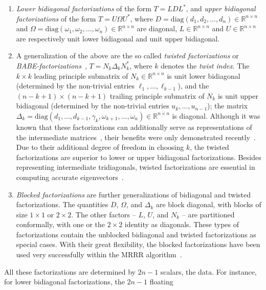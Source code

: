 \documentclass[final]{siamltex}
\newcommand{\R}{\mathbb{R}}
\newcommand{\Rnn}{\R^{n \times n}}
\begin{document}
\begin{enumerate}
\item {\it Lower bidiagonal factorizations} of the form $T = L D L^*$, and {\it
    upper bidiagonal factorizations} of the form $T = U \Omega U^*$, where $D = 
  \mbox{diag}(d_1,d_2,\ldots,d_n) \in \Rnn$ and $\Omega = 
  \mbox{diag}(\omega_1,\omega_2,\ldots,\omega_n) \in \Rnn$ are diagonal,  
  $L \in \Rnn$ and $U \in \Rnn$ are respectively unit lower bidiagonal and
  unit upper bidiagonal. 
\item A generalization of the above are the so called {\it twisted
    factorizations} or {\it
    BABE-factorizations}~\cite{Fernando97}, $T = N_k 
  \Delta_k N_k^*$, where 
  $k$ denotes the {\it twist index}. The $k \times k$ leading principle
  submatrix of $N_k \in \Rnn$ is unit lower bidiagonal (determined by the non-trivial
  entries $\ell_1,\ldots,\ell_{k-1}$), and the $(n-k+1) \times (n-k+1)$
  trailing principle submatrix of $N_k$ is unit upper bidiagonal (determined by the non-trivial
  entries $u_k,\ldots,u_{n-1}$); the matrix $\Delta_k =
\mbox{diag}(d_1,\ldots,d_{k-1},\gamma_k,\omega_{k+1},\ldots,\omega_n) \in \Rnn$ 
is diagonal. 
Although 
it was known that these factorizations can additionally serve as
representations of the intermediate
matrices~\cite{Dhillon:Diss,Dhillon:2004:Ortvecs},
their benefits were only demonstrated 
recently~\cite{Willems:Diss,Willems:twisted}. 
Due to their additional degree of freedom in choosing $k$, the twisted
factorizations
are superior to lower or upper bidiagonal factorizations. 
Besides representing intermediate tridiagonals, twisted factorizations are
essential in computing accurate eigenvectors~\cite{Fernando97,Dhillon:2004:Ortvecs}.
\item {\it Blocked
    factorizations} are further generalizations of bidiagonal and twisted factorizations. The
  quantities $D$, $\Omega$, and  
  $\Delta_k$ are block diagonal, with blocks of size $1 \times
  1$ or $2 \times 2$. The other factors -- $L$, $U$, and $N_k$ -- are
  partitioned conformally, with one or the $2 \times 2$ identity as diagonals. These types of
  factorizations contain the unblocked bidiagonal and twisted factorizations
  as special cases. With their great flexibility, the blocked factorizations
  have been used very successfully within the MRRR
  algorithm~\cite{Willems:Diss,Willems:blocked}. 
\end{enumerate}
All these factorizations are determined by $2n-1$ scalars, the data. 
For instance, for lower bidiagonal factorizations, the $2n-1$ floating
\end{document}
